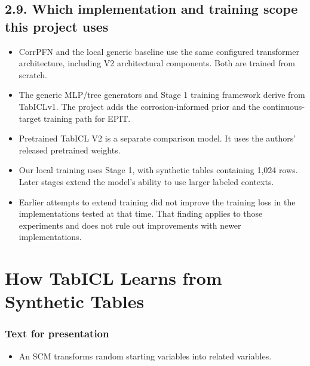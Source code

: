 \documentclass[11pt]{article}
\newenvironment{notes}
  {\begin{itemize}\setlength{\itemsep}{0.45em}\setlength{\parsep}{0pt}}
  {\end{itemize}}
\begin{document}
\subsection*{2.9. Which implementation and training scope this project uses}

\begin{notes}

    \item CorrPFN and the local generic baseline use the same configured transformer
    architecture, including V2 architectural components. Both are trained from scratch.

    \item The generic MLP/tree generators and Stage 1 training framework derive from
    TabICLv1. The project adds the corrosion-informed prior and the continuous-target
    training path for EPIT.

    \item Pretrained TabICL V2 is a separate comparison model. It uses the authors’ released
    pretrained weights.

    \item Our local training uses Stage 1, with synthetic tables containing 1,024 rows.
    Later stages extend the model’s ability to use larger labeled contexts.

    \item Earlier attempts to extend training did not improve the training loss in the
    implementations tested at that time. That finding applies to those experiments and does
    not rule out improvements with newer implementations.

\end{notes}

\section*{How TabICL Learns from Synthetic Tables}

\subsubsection*{Text for presentation}

\begin{notes}

    \item An SCM transforms random starting variables into related variables.

\end{notes}
\end{document}
